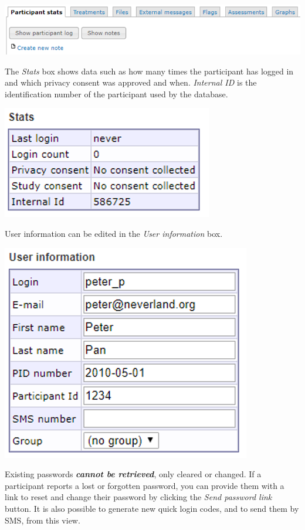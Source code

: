 \documentclass[]{book}
\begin{document}
\includegraphics{images/new-images/participantStatsLogNotes.png}

The \emph{Stats} box shows data such as how many times the participant has logged in and which privacy consent was approved and when. \emph{Internal ID} is the identification number of the participant used by the database.

\includegraphics{images/new-images/participantsStatsSmall.png}

User information can be edited in the \emph{User information} box.

\includegraphics{images/new-images/participantInfo.png}

Existing passwords \emph{\textbf{cannot be retrieved}}, only cleared or changed. If a participant reports a lost or forgotten password, you can provide them with a link to reset and change their password by clicking the \emph{Send password link} button.
It is also possible to generate new quick login codes, and to send them by SMS, from this view.
\end{document}
